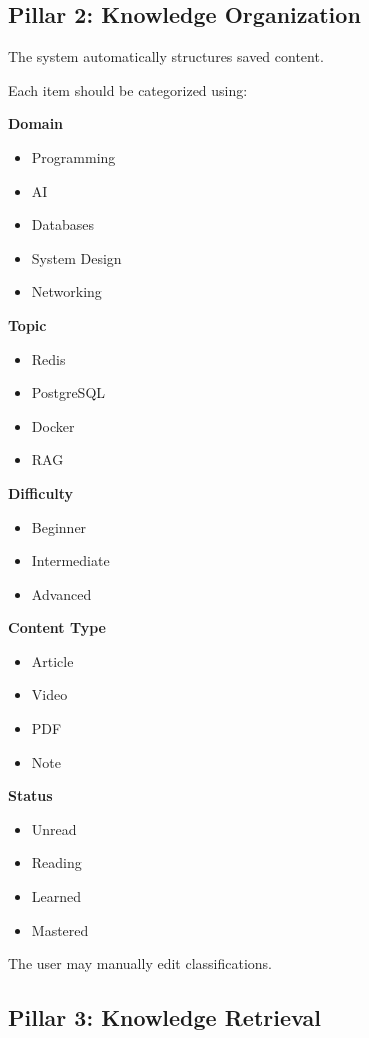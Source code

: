 \documentclass[11pt]{article}
\begin{document}
\subsection{Pillar 2: Knowledge Organization}

The system automatically structures saved content.

Each item should be categorized using:

\textbf{Domain}
\begin{itemize}[nosep]
    \item Programming
    \item AI
    \item Databases
    \item System Design
    \item Networking
\end{itemize}

\textbf{Topic}
\begin{itemize}[nosep]
    \item Redis
    \item PostgreSQL
    \item Docker
    \item RAG
\end{itemize}

\textbf{Difficulty}
\begin{itemize}[nosep]
    \item Beginner
    \item Intermediate
    \item Advanced
\end{itemize}

\textbf{Content Type}
\begin{itemize}[nosep]
    \item Article
    \item Video
    \item PDF
    \item Note
\end{itemize}

\textbf{Status}
\begin{itemize}[nosep]
    \item Unread
    \item Reading
    \item Learned
    \item Mastered
\end{itemize}

The user may manually edit classifications.

\subsection{Pillar 3: Knowledge Retrieval}
\end{document}
